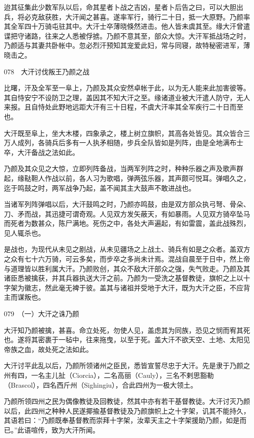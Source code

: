 \documentclass[12pt,UTF8]{ctexbook}
\begin{document}
迨其征集此少数军队以后，命其星者卜战之吉凶，星者卜后告之曰，可以大胆出兵，将必克敌获胜，大汗闻之甚喜。遂率军行，骑行二十日，抵一大原野。乃颜率其全军四十万骑屯驻其中。大汗士卒薄晓倏然进击。他人皆未虞其至。缘大汗曾遣谍把守诸路，往来之人悉被俘掳。乃颜不意其至，部众大惊。大汗军抵战场之时，乃颜适与其妻共卧帐中。忽必烈汗预知其宠爱此妇，常与同寝，故特秘密进军，薄晓击之。





078　大汗讨伐叛王乃颜之战

比曙，汗及全军至一阜上，乃颜及其众安然卓帐于此，以为无人能来此加害彼等。其自恃安宁不设防卫之理，盖因其不知大汗之至。缘诸道业被大汗遣人防守，无人来报。且自恃处此野地远距大汗有三十日程，不虞大汗率其全军疾行二十日而至也。

大汗既至阜上，坐大木楼，四象承之，楼上树立旗帜，其高各处皆见。其众皆合三万人成列，各骑兵后多有一人执矛相随，步兵全队皆如是列阵，由是全地满布士卒，大汗备战之法如此。

乃颜及其众见之大惊，立即列阵备战，当两军列阵之时，种种乐器之声及歌声群起，缘鞑靼人作战以前，各人习为歌唱，弹两弦乐器，其声颇可悦耳。弹唱久之，迄于鸣鼓之时，两军战争乃起，盖不闻其主大鼓声不敢进战也。

当诸军列阵弹唱以后，大汗鼓鸣之时，乃颜亦鸣鼓，由是双方部众执弓弩、骨朵、刀、矛而战，其迅捷可谓奇观。人见双方发矢蔽天，有如暴雨。人见双方骑卒坠马而死者为数甚众，陈尸满地。死伤之中，各处大声遍起，有如雷震，盖此战殊烈，见人辄杀也。

是战也，为现代从未见之剧战，从未见疆场之上战土、骑兵有如是之众者。盖双方之众有七十六万骑，可云多矣，而步卒之多尚未计焉。混战自晨至于日中，然上帝与道理皆以胜利属大汗。乃颜败创，其众不敌大汗部众之强，失气败走。乃颜及其诸臣悉被擒获，并其兵器执送大汗之前。乃颜为一受洗之基督教徒，旗帜之上以十字架为徽志，然此毫无裨于彼。盖其与诸祖并受地于大汗，既为大汗之臣，不应背主而谋叛也。





079　（一）大汗之诛乃颜

大汗知乃颜被擒，甚喜。命立处死，勿使人见，盖虑其为同族，恐见之悯而宥其死也。遂将其密裹于一毡中，往来拖曳，以至于死。盖大汗不欲天空、土地、太阳见帝族之血，故处死之法如此。

大汗讨平此乱以后，乃颜所领诸州之臣民，悉皆宣誓尽忠于大汗。先是隶于乃颜之州有四，一名主儿扯（Ciorcia），二名高丽（Cauly），三名不剌思豁勒（Brascol），四名西斤州（Sighingiu），合此四州为一极大领土。

乃颜所领四州之民为偶像教徒及回教徒，然其中亦有若干基督教徒。大汗讨灭乃颜以后，此四州之种种人民遂揶揄基督教徒及乃颜旗帜上之十字架，讥其不能持久，其语若曰：“乃颜既奉基督教而崇拜十字架，汝辈天主之十字架援助乃颜，如是而已。”此语喧传，致为大汗所闻。
\end{document}
